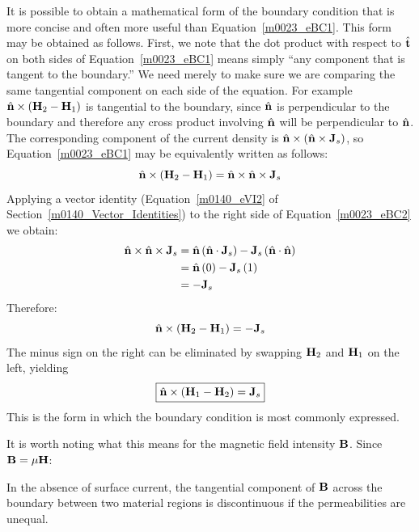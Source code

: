 It is possible to obtain a mathematical form of the boundary condition that is more concise and often more useful than Equation~\ref{m0023_eBC1}.
This form may be obtained as follows.
First, we note that the dot product with respect to $\hat{\bf t}$ on both sides of Equation~\ref{m0023_eBC1} means simply ``any component that is tangent to the boundary.''  We need merely to make sure we are comparing the same tangential component on each side of the equation.  
For example $\hat{\bf n} \times \left( {\bf H}_2 -{\bf H}_1 \right)$ is tangential to the boundary, since $\hat{\bf n}$ is perpendicular to the boundary and therefore any cross product involving $\hat{\bf n}$ will be perpendicular to $\hat{\bf n}$.
The corresponding component of the current density is $\hat{\bf n} \times \left( \hat{\bf n} \times {\bf J}_s \right)$, so Equation~\ref{m0023_eBC1} may be equivalently written as follows: 
% 
\begin{equation}   
\hat{\bf n} \times \left( {\bf H}_2 -{\bf H}_1 \right)  = \hat{\bf n} \times \hat{\bf n} \times {\bf J}_s 
\label{m0023_eBC2}
\end{equation}
%
Applying a vector identity (Equation~\ref{m0140_eVI2} of Section~\ref{m0140_Vector_Identities}) to the right side of Equation~\ref{m0023_eBC2} we obtain: 
%
\begin{align}   
\hat{\bf n} \times \hat{\bf n} \times {\bf J}_s 
     &= \hat{\bf n} \left(\hat{\bf n}\cdot{\bf J}_s\right) - {\bf J}_s\left(\hat{\bf n}\cdot\hat{\bf n}\right) \nonumber \\
     &= \hat{\bf n} \left(0\right) - {\bf J}_s\left(1\right) \nonumber \\
     &= -{\bf J}_s
\end{align}
%
Therefore:
% 
\begin{equation}   
\hat{\bf n} \times \left( {\bf H}_2 -{\bf H}_1 \right)  = -{\bf J}_s
\end{equation}
%
The minus sign on the right can be eliminated by swapping ${\bf H}_2$ and ${\bf H}_1$ on the left, yielding
% 
\begin{equation}   
\boxed{
 \hat{\bf n} \times \left( {\bf H}_1 -{\bf H}_2 \right) = {\bf J}_s                                              
}
\end{equation}
%
This is the form in which the boundary condition is most commonly expressed.

It is worth noting what this means for the magnetic field intensity ${\bf B}$. Since ${\bf B}=\mu{\bf H}$:
%
\begin{mdframed}[backgroundcolor=yellow!20,nobreak=true] 
In the absence of surface current, the tangential component of ${\bf B}$ across the boundary between two material regions is discontinuous if the permeabilities are unequal.
\end{mdframed}

